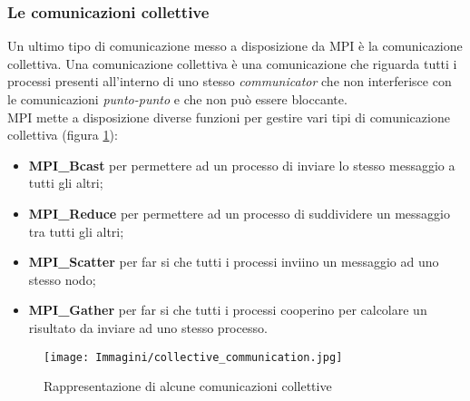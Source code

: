 \subsubsection{Le comunicazioni collettive}\label{subsubsec:coll_comm}
Un ultimo tipo di comunicazione messo a disposizione da MPI è la comunicazione collettiva. Una comunicazione collettiva è una comunicazione che riguarda tutti i processi presenti all'interno di uno stesso \textit{communicator} che non interferisce con le comunicazioni \emph{punto-punto} e che non può essere bloccante.\\
MPI mette a disposizione diverse funzioni per gestire vari tipi di comunicazione collettiva (figura \ref{fig:mpi_collect_comm}):
\begin{itemize}
\item \textbf{MPI\_Bcast} per permettere ad un processo di inviare lo stesso messaggio a tutti gli altri;
\item \textbf{MPI\_Reduce} per permettere ad un processo di suddividere un messaggio tra tutti gli altri;
\item \textbf{MPI\_Scatter} per far si che tutti i processi inviino un messaggio ad uno stesso nodo;
\item \textbf{MPI\_Gather} per far si che tutti i processi cooperino per calcolare un risultato da inviare ad uno stesso processo.
\end{itemize}
\begin{figure}[H]
\centering
\texttt{[image: Immagini/collective\_communication.jpg]}
\caption{Rappresentazione di alcune comunicazioni collettive}
\label{fig:mpi_collect_comm}
\end{figure}

